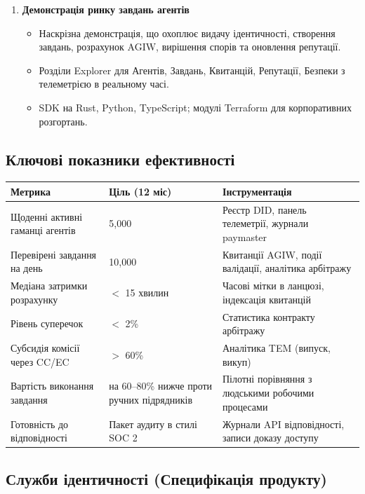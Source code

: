\documentclass[11pt]{article}
\begin{document}
\begin{enumerate}[label=\textbf{D\arabic*.}, leftmargin=*]
  \item \textbf{Демонстрація ринку завдань агентів}
  \begin{itemize}[noitemsep]
    \item Наскрізна демонстрація, що охоплює видачу ідентичності, створення завдань, розрахунок AGIW, вирішення спорів та оновлення репутації.
    \item Розділи Explorer для Агентів, Завдань, Квитанцій, Репутації, Безпеки з телеметрією в реальному часі.
    \item SDK на Rust, Python, TypeScript; модулі Terraform для корпоративних розгортань.
  \end{itemize}
\end{enumerate}

\subsection{Ключові показники ефективності}
\begin{longtable}{@{}p{}p{}p{}@{}}
\toprule
\textbf{Метрика} & \textbf{Ціль (12 міс)} & \textbf{Інструментація} \\\midrule
Щоденні активні гаманці агентів & 5,000 & Реєстр DID, панель телеметрії, журнали paymaster \\
Перевірені завдання на день & 10,000 & Квитанції AGIW, події валідації, аналітика арбітражу \\
Медіана затримки розрахунку & $<$ 15 хвилин & Часові мітки в ланцюзі, індексація квитанцій \\
Рівень суперечок & $<$ 2\% & Статистика контракту арбітражу \\
Субсидія комісії через CC/EC & $>$ 60\% & Аналітика TEM (випуск, викуп) \\
Вартість виконання завдання & на 60--80\% нижче проти ручних підрядників & Пілотні порівняння з людськими робочими процесами \\
Готовність до відповідності & Пакет аудиту в стилі SOC 2 & Журнали API відповідності, записи доказу доступу \\
\bottomrule
\end{longtable}

\subsection{Служби ідентичності (Специфікація продукту)}
\label{sec:identity-spec}
\end{document}
